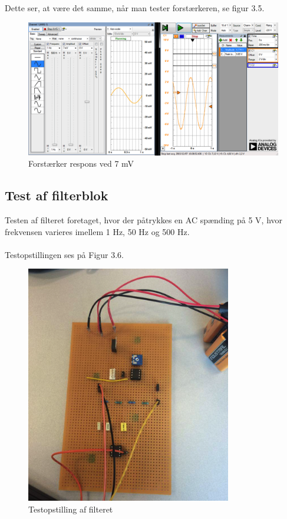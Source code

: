 Dette ser, at være det samme, når man tester forstærkeren, se figur 3.5. 

\begin{figure}[H]
	\centering
	\includegraphics[width=1\textwidth]{Figurer/Snip20151207_37}
	\caption{Forstærker respons ved 7 mV}
\end{figure}


\subsection{Test af filterblok}
Testen af filteret foretaget, hvor der påtrykkes en AC spænding på 5 V, hvor frekvensen varieres imellem 1 Hz, 50 Hz og 500 Hz. \\ \\

Testopstillingen ses på Figur 3.6.  

\begin{figure}[H]
	\centering
	\includegraphics[width=0.8\textwidth]{Figurer/Snip20151207_38}
	\caption{Testopstilling af filteret}
	\label{fig:Filter}
\end{figure}

